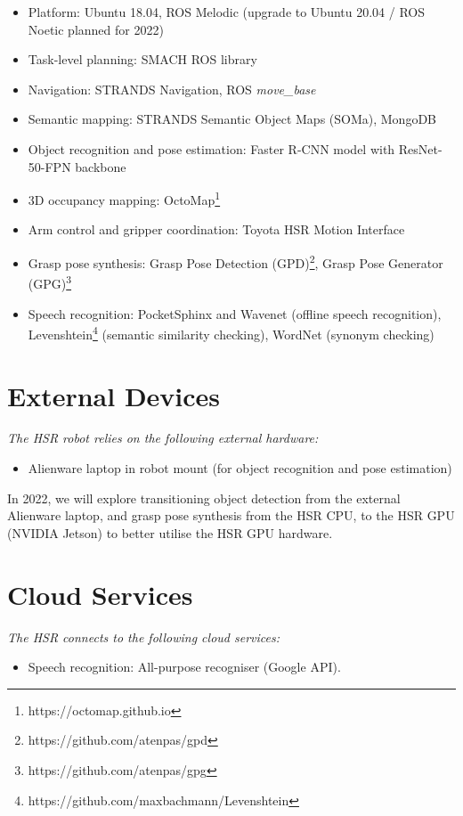 \begin{itemize}
	\item Platform: Ubuntu 18.04, ROS Melodic (upgrade to Ubuntu 20.04 / ROS Noetic planned for 2022)
	\item Task-level planning: SMACH ROS library
	\item Navigation: STRANDS Navigation, ROS \textit{move\_base}
	\item Semantic mapping: STRANDS Semantic Object Maps (SOMa), MongoDB
	\item Object recognition and pose estimation: Faster R-CNN model with ResNet-50-FPN backbone
	\item 3D occupancy mapping: OctoMap\footnote{https://octomap.github.io}
	\item Arm control and gripper coordination: Toyota HSR Motion Interface
	\item Grasp pose synthesis: Grasp Pose Detection  (GPD)\footnote{https://github.com/atenpas/gpd}, Grasp Pose Generator (GPG)\footnote{https://github.com/atenpas/gpg}
	\item Speech recognition: PocketSphinx and Wavenet (offline speech recognition), Levenshtein\footnote{https://github.com/maxbachmann/Levenshtein} (semantic similarity checking), WordNet (synonym checking) 
\end{itemize}

\section*{External Devices}

\textit{The HSR robot relies on the following external hardware:}

\begin{itemize}
	\item Alienware laptop in robot mount (for object recognition and pose estimation)
\end{itemize}

In 2022, we will explore transitioning object detection from the external Alienware laptop, and grasp pose synthesis from the HSR CPU, to the HSR GPU (NVIDIA Jetson) to better utilise the HSR GPU hardware.

\section*{Cloud Services}

\textit{The HSR connects to the following cloud services:}
\begin{itemize}
	\item Speech recognition: All-purpose recogniser (Google API).
\end{itemize}